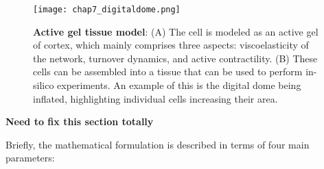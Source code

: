 \begin{figure}[]
	\centering
	\texttt{[image: chap7\_digitaldome.png]}
	\caption{\label{fig_7_2} \textbf{Active gel tissue model}: (A) The cell is modeled as an active gel of cortex, which mainly comprises three aspects: viscoelasticity of the network, turnover dynamics, and active contractility. (B) These cells can be assembled into a tissue that can be used to perform in-silico experiments. An example of this is the digital dome being inflated, highlighting individual cells increasing their area.}
\end{figure}

\textbf{Need to fix this section totally}

\newpage
Briefly, the mathematical formulation is described in terms of four main parameters:

